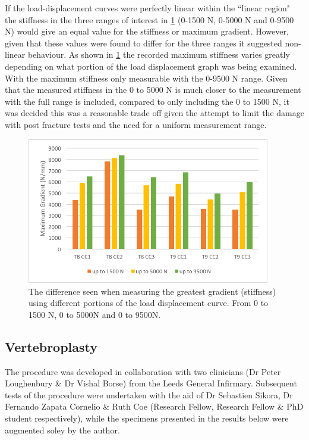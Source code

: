 If the load-displacement curves were perfectly linear within the ``linear
region" the stiffness in the three ranges of interest in
\cref{fig:barchartcompgrads} (0-1500 N, 0-5000 N and 0-9500 N) would give an equal value for the stiffness or
maximum gradient. However, given that these values were found to differ for the
three ranges it suggested non-linear behaviour.  As shown in
\cref{fig:barchartcompgrads} the recorded maximum stiffness varies greatly
depending on what portion of the load displacement graph was being examined.
With the maximum stiffness only measurable with the 0-9500 N range.
Given that the measured stiffness in the 0 to 5000 N is much closer to the
measurement with the full range is included, compared to only including the 0
to 1500 N, it was decided this was a reasonable trade off given the attempt to
limit the damage with post fracture tests and the need for a uniform
measurement range.

\begin{figure}[ht!]

\centering
\includegraphics[width=4.18472in]{images/barchartCompGrads.png}
\caption{The difference seen when measuring the greatest gradient (stiffness) using different portions of the load displacement curve. From 0 to 1500 N, 0 to 5000N and 0 to 9500N.}
\label{fig:barchartcompgrads}
\end{figure}


\subsection{Vertebroplasty }\label{vertebroplasty-bov} The procedure was
developed in collaboration with two clinicians (Dr Peter Loughenbury \& Dr
Vishal Borse) from the Leeds General Infirmary. Subsequent tests of the
procedure were undertaken with the aid of Dr Sebastien Sikora, Dr Fernando
Zapata Cornelio \& Ruth Coe (Research Fellow, Research Fellow \& PhD student
respectively), while the specimens presented in the results below were
augmented soley by the author.

